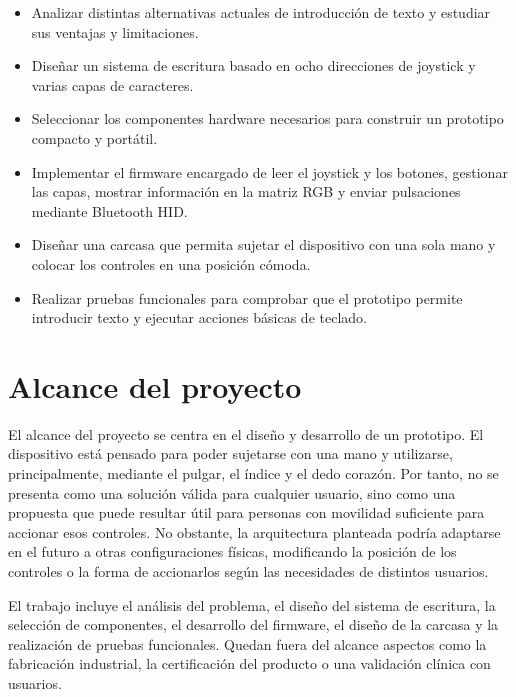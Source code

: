 \documentclass[
    school=etsisi,
    type=pfg,
    degree=61CI,
]{upm-report}
\begin{document}
\begin{itemize}
    \item Analizar distintas alternativas actuales de introducción de texto y
    estudiar sus ventajas y limitaciones.

    \item Diseñar un sistema de escritura basado en ocho direcciones de joystick
    y varias capas de caracteres.

    \item Seleccionar los componentes hardware necesarios para construir un
    prototipo compacto y portátil.

    \item Implementar el firmware encargado de leer el joystick y los botones,
    gestionar las capas, mostrar información en la matriz RGB y enviar
    pulsaciones mediante Bluetooth HID.

    \item Diseñar una carcasa que permita sujetar el dispositivo con una sola
    mano y colocar los controles en una posición cómoda.

    \item Realizar pruebas funcionales para comprobar que el prototipo permite
    introducir texto y ejecutar acciones básicas de teclado.
\end{itemize}

\section{Alcance del proyecto}
\label{sec:alcance}

El alcance del proyecto se centra en el diseño y desarrollo de un prototipo. El
dispositivo está pensado para poder sujetarse con una mano y utilizarse,
principalmente, mediante el pulgar, el índice y el dedo corazón. Por tanto, no se
presenta como una solución válida para cualquier usuario, sino como una propuesta
que puede resultar útil para personas con movilidad suficiente para accionar esos
controles. No obstante, la arquitectura planteada podría adaptarse en el futuro a otras configuraciones físicas, modificando la posición de los controles o la forma de accionarlos según las necesidades de distintos usuarios.

El trabajo incluye el análisis del problema, el diseño del sistema de escritura,
la selección de componentes, el desarrollo del firmware, el diseño de la carcasa y
la realización de pruebas funcionales. Quedan fuera del alcance aspectos como la
fabricación industrial, la certificación del producto o una validación clínica con
usuarios.
\end{document}
